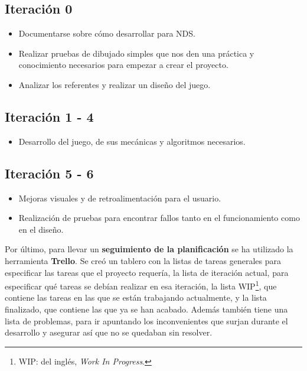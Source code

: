 \subsection{Iteración 0}

\begin{itemize}
 \item Documentarse sobre cómo desarrollar para NDS. 
 \item Realizar pruebas de dibujado simples que nos den una práctica y conocimiento necesarios para empezar a crear el proyecto.
 \item Analizar los referentes y realizar un diseño del juego.
\end{itemize}

\subsection{Iteración 1 - 4}

\begin{itemize}
 \item Desarrollo del juego, de sus mecánicas y algoritmos necesarios.
 \end{itemize}
 
 \subsection{Iteración 5 - 6}
 
 \begin{itemize}
 \item Mejoras visuales y de retroalimentación para el usuario. 
 \item Realización de pruebas para encontrar fallos tanto en el funcionamiento como en el diseño.

 \end{itemize}
 
  \vspace{0.5cm}
 
 Por último, para llevar un \textbf{seguimiento de la planificación} se ha utilizado la herramienta \textbf{Trello}. Se creó un tablero con la listas de tareas generales para especificar las tareas que el proyecto requería, la lista de iteración actual, para especificar qué tareas se debían realizar en esa iteración, la lista WIP\footnote{WIP: del inglés, \textit{Work In Progress}.}, que contiene las tareas en las que se están trabajando actualmente, y la lista finalizado, que contiene las que ya se han acabado. Además también tiene una lista de problemas, para ir apuntando los inconvenientes que surjan durante el desarrollo y asegurar así que no se quedaban sin resolver.
 
